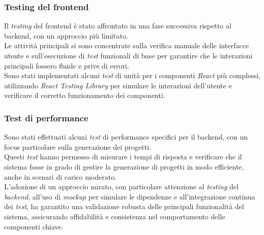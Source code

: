 \subsubsection{Testing del \gls{frontend}}  
Il \textit{testing} del \gls{frontend} è stato affrontato in una fase successiva rispetto al \gls{backend}, con un approccio più limitato.\\
Le attività principali si sono concentrate sulla verifica manuale delle interfacce utente e sull’esecuzione di \textit{test} funzionali di base per garantire che le interazioni principali fossero fluide e prive di errori.\\
Sono stati implementati alcuni \textit{test} di unità per i componenti \textit{React} più complessi, utilizzando \textit{React Testing Library} per simulare le interazioni dell'utente e verificare il corretto funzionamento dei componenti.\\

\subsubsection{Test di performance}  
Sono stati effettuati alcuni \textit{test} di performance specifici per il \gls{backend}, con un focus particolare sulla generazione dei progetti.\\
Questi \textit{test} hanno permesso di misurare i tempi di risposta e verificare che il sistema fosse in grado di gestire la generazione di progetti in modo efficiente, anche in scenari di carico moderato.\\

\noindent L’adozione di un approccio mirato, con particolare attenzione al \textit{testing} del \textit{backend}, all’uso di \textit{mockup} per simulare le dipendenze e all’integrazione continua dei \textit{test}, ha garantito una validazione robusta delle principali funzionalità del sistema, assicurando affidabilità e consistenza nel comportamento delle componenti chiave.